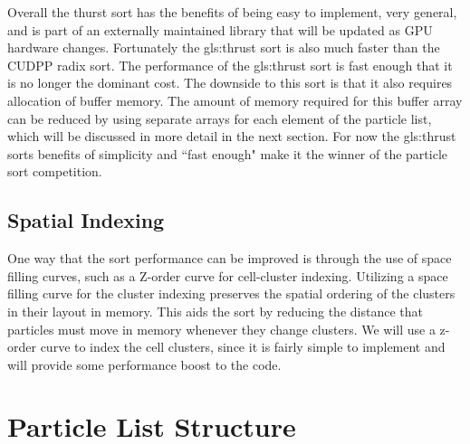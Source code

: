 Overall the thurst sort has the benefits of being easy to implement, very general, and is part of an externally maintained library that will be updated as GPU hardware changes. Fortunately the \gls{gls:thrust} sort is also much faster than the CUDPP radix sort. The performance of the \gls{gls:thrust} sort is fast enough that it is no longer the dominant cost. The downside to this sort is that it also requires allocation of buffer memory. The amount of memory required for this buffer array can be reduced by using separate arrays for each element of the particle list, which will be discussed in more detail in the next section. For now the \gls{gls:thrust} sorts benefits of simplicity and ``fast enough" make it the winner of the particle sort competition. 

\subsection{Spatial Indexing}

One way that the sort performance can be improved is through the use of space filling curves, such as a Z-order curve for cell-cluster indexing. Utilizing a space filling curve for the cluster indexing preserves the spatial ordering of the clusters in their layout in memory. This aids the sort by reducing the distance that particles must move in memory whenever they change clusters. We will use a z-order curve to index the cell clusters, since it is fairly simple to implement and will provide some performance boost to the code.

	\section{Particle List Structure}

